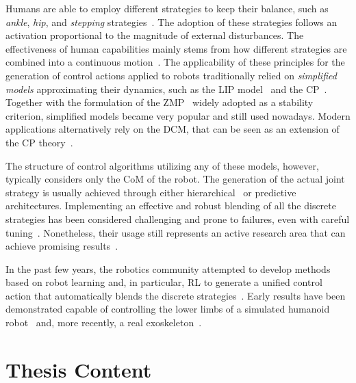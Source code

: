 Humans are able to employ different strategies to keep their balance, such as \emph{ankle}, \emph{hip}, and \emph{stepping} strategies~\parencite{nashner_organization_1985, maki_role_1997, stephens_humanoid_2007}.
The adoption of these strategies follows an activation proportional to the magnitude of external disturbances.
The effectiveness of human capabilities mainly stems from how different strategies are combined into a continuous motion~\parencite{mcgreavy_unified_2020}.
The applicability of these principles for the generation of control actions applied to robots traditionally relied on \emph{simplified models} approximating their dynamics, such as the \ac{LIP} model~\parencite{kajita_3d_2001} and the \ac{CP}~\parencite{pratt_capture_2006}.
Together with the formulation of the \ac{ZMP}~\parencite{vukobratovic_contribution_1969, vukobratovic_zero-moment_2004} widely adopted as a stability criterion, simplified models became very popular and still used nowadays.
Modern applications alternatively rely on the \ac{DCM}, that can be seen as an extension of the \ac{CP} theory~\parencite{shafiee_online_2019}.

The structure of control algorithms utilizing any of these models, however, typically considers only the \ac{CoM} of the robot.
The generation of the actual joint strategy is usually achieved through either hierarchical~\parencite{feng_optimization_2014} or predictive~\parencite{wieber_trajectory_2006, aftab_ankle_2012} architectures.
Implementing an effective and robust blending of all the discrete strategies has been considered challenging and prone to failures, even with careful tuning~\parencite{mcgreavy_unified_2020}.
Nonetheless, their usage still represents an active research area that can achieve promising results~\parencite{jeong_robust_2019}.

In the past few years, the robotics community attempted to develop methods based on robot learning and, in particular, \ac{RL} to generate a unified control action that automatically blends the discrete strategies~\parencite{yang_learning_2018}.
Early results have been demonstrated capable of controlling the lower limbs of a simulated humanoid robot~\parencite{kim_push_2019} and, more recently, a real exoskeleton~\parencite{duburcq_reactive_2022}.

\section{Thesis Content}
\label{sec:thesis_content}

